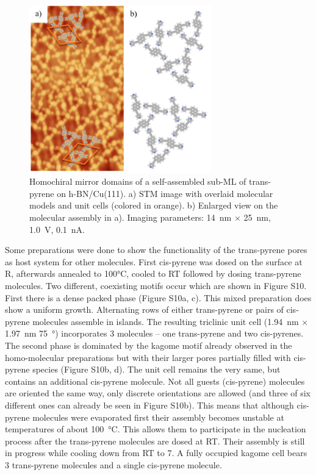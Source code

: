 \begin{figure}[]\centering
	\includegraphics[width=0.7\textwidth]{./images/paper/pyrene/figure-S9}
	\caption{Homochiral mirror domains of a self-assembled sub-ML of trans-pyrene on h-BN/Cu(111). a) STM image with overlaid molecular models and unit cells (colored in orange). b) Enlarged view on the molecular assembly in a). Imaging parameters: \SI{14}{\nano \meter} $\times$ \SI{25}{\nano \meter}, \SI{1.0}{\volt}, \SI{0.1}{\nano \ampere}.
	}
	\label{fig:pyene-S9}
\end{figure}

Some preparations were done to show the functionality of the trans-pyrene pores as host system for other molecules. First cis-pyrene was dosed on the surface at R, afterwards annealed to 100°C, cooled to RT followed by dosing trans-pyrene molecules. Two different, coexisting motifs occur which are shown in Figure S10. First there is a dense packed phase (Figure S10a, c). This mixed preparation does show a uniform growth. Alternating rows of either trans-pyrene or pairs of cis-pyrene molecules assemble in islands. The resulting triclinic unit cell (\SI{1.94}{\nano \meter} $\times$ \SI{1.97}{\nano \meter} \SI{75}{\degree}) incorporates 3 molecules – one trans-pyrene and two cis-pyrenes. The second phase is dominated by the kagome motif already observed in the homo-molecular preparations but with their larger pores partially filled with cis-pyrene species (Figure S10b, d). The unit cell remains the very same, but contains an additional cis-pyrene molecule. Not all guests (cis-pyrene) molecules are oriented the same way, only discrete orientations are allowed (and three of six different ones can already be seen in Figure S10b). This means that although cis-pyrene molecules were evaporated first their assembly becomes unstable at temperatures of about \SI{100}{\celsius}. This allows them to participate in the nucleation process after the trans-pyrene molecules are dosed at RT. Their assembly is still in progress while cooling down from RT to \SI{7}{\Kelvin}. A fully occupied kagome cell bears 3 trans-pyrene molecules and a single cis-pyrene molecule.

